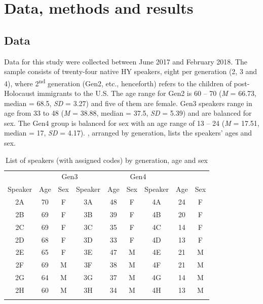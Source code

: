 \documentclass[output=paper]{langsci/langscibook}
\begin{document}
\section{Data, methods and results}
\label{sec:nove:4}


 
\subsection{Data}
\label{sec:nove:4.1}


Data for this study were collected between June 2017 and February 2018. The sample consists of twenty-four native HY speakers, eight per generation (2, 3 and 4), where 2\textsuperscript{nd} generation (Gen2, etc., henceforth) refers to the children of post-Holocaust immigrants to the U.S. The age range for Gen2 is 60 – 70 (\textit{M} = 66.73, median = 68.5, \textit{SD} = 3.27) and five of them are female. Gen3 speakers range in age from 33 to 48 (\textit{M} = 38.88, median = 37.5, \textit{SD} = 5.39) and are balanced for sex. The Gen4 group is balanced for sex with an age range of 13 – 24 (\textit{M} = 17.51, median = 17, \textit{SD} = 4.17).  , arranged by generation, lists the speakers’ ages and sex. 


\begin{table}
	\begin{tabular}{ *{9}{c} }
	\lsptoprule
	\multicolumn{3}{c}{Gen2} & \multicolumn{3}{c}{Gen3} & \multicolumn{3}{c}{Gen4}\\\cmidrule(lr){1-3}\cmidrule(lr){4-6}\cmidrule(lr){7-9}
	{Speaker} & {Age} & Sex & {Speaker} & {Age} & Sex & {Speaker} & {Age} & Sex\\\midrule
	 2A & 70 & F & 3A & 48 & F & 4A & 24 & F\\
	 2B & 69 & F & 3B & 39 & F & 4B & 20 & F\\
 	 2C & 69 & F & 3C & 35 & F & 4C & 14 & F\\
 	 2D & 68 & F & 3D & 33 & F & 4D & 13 & F\\
 	 2E & 65 & F & 3E & 47 & M & 4E & 21 & M\\
 	 2F & 69 & M & 3F & 38 & M & 4F & 21 & M\\
 	 2G & 64 & M & 3G & 37 & M & 4G & 14 & M\\
 	 2H & 60 & M & 3H & 34 & M & 4H & 13 & M\\
	\lspbottomrule
	\end{tabular}
	\caption{List of speakers (with assigned codes) by generation, age and sex}\label{tab:nove:1}
\end{table}
\end{document}
